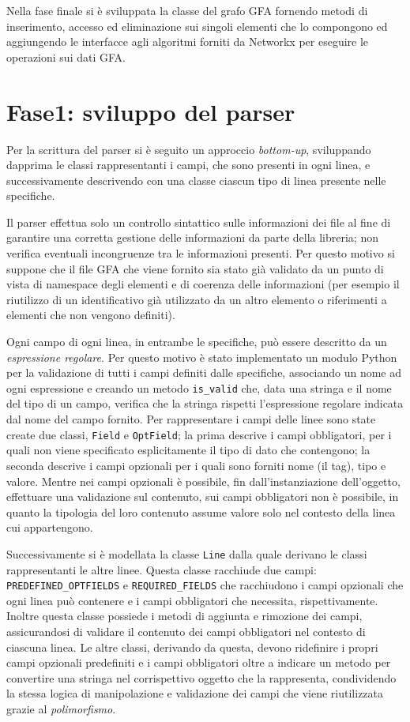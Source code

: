Nella fase finale si è sviluppata la classe del grafo GFA fornendo
metodi di inserimento, accesso ed eliminazione sui singoli elementi che
lo compongono ed aggiungendo le interfacce agli algoritmi forniti da Networkx
per eseguire le operazioni sui dati GFA.

\section{Fase1: sviluppo del parser}
Per la scrittura del parser si è seguito un approccio \emph{bottom-up},
sviluppando dapprima le classi rappresentanti i campi,
che sono presenti in ogni linea, 
e successivamente descrivendo con una classe ciascun tipo
di linea presente nelle specifiche.

Il parser effettua solo un controllo sintattico sulle informazioni dei file
al fine di garantire una corretta gestione delle informazioni da parte
della libreria; non verifica eventuali incongruenze tra le informazioni
presenti. Per questo motivo si suppone che il file GFA che viene fornito
sia stato già validato da un punto di vista di namespace degli elementi
e di coerenza delle informazioni (per esempio il riutilizzo di un identificativo
già utilizzato da un altro elemento o riferimenti a elementi
che non vengono definiti).

Ogni campo di ogni linea, in entrambe le specifiche, può essere descritto
da un \emph{espressione regolare}. Per questo motivo è stato
implementato un modulo Python per la validazione di tutti i campi definiti
dalle specifiche, associando un nome ad ogni espressione e creando un metodo
\texttt{is\_valid} che, data una stringa e il nome del tipo di un campo,
verifica che la stringa rispetti l'espressione regolare indicata dal nome
del campo fornito.
Per rappresentare i campi delle linee sono state create due classi,
\texttt{Field} e \texttt{OptField}; la prima
descrive i campi obbligatori, per i quali non viene specificato
esplicitamente il tipo di dato che contengono; la seconda
descrive i campi opzionali per i quali sono forniti
nome (il tag), tipo e valore. Mentre nei campi opzionali
è possibile, fin dall'instanziazione dell'oggetto, effettuare una validazione
sul contenuto, sui campi obbligatori non è possibile, in quanto
la tipologia del loro contenuto assume valore solo nel contesto
della linea cui appartengono.

Successivamente si è modellata la classe \texttt{Line} dalla quale
derivano le classi rappresentanti le altre linee. Questa classe
racchiude due campi: \texttt{PREDEFINED\_OPTFIELDS}
e \texttt{REQUIRED\_FIELDS} che racchiudono i campi opzionali che
ogni linea può contenere e i campi obbligatori che necessita, rispettivamente.
Inoltre questa classe possiede i metodi di aggiunta e rimozione dei campi,
assicurandosi di validare il contenuto dei campi obbligatori nel contesto
di ciascuna linea. Le altre classi, derivando da questa, devono
ridefinire i propri campi opzionali predefiniti e i campi obbligatori oltre
a indicare un metodo per convertire una stringa
nel corrispettivo oggetto che la rappresenta, condividendo la stessa
logica di manipolazione e validazione dei campi che viene riutilizzata
grazie al \emph{polimorfismo}.

